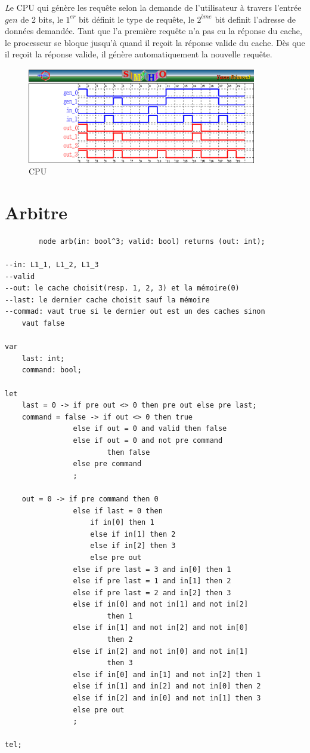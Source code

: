 \documentclass[a4paper,11pt]{report}
\begin{document}
	{\huge \itshape L}e CPU qui génère les requête selon la demande de l'utilisateur à travers l'entrée $gen$ de 2 bits, le $1^{er}$ bit définit le type de requête, le $2^{ème}$ bit definit l'adresse de données demandée. Tant que l'a première requête n'a pas eu la réponse du cache, le processeur se bloque jusqu'à quand il reçoit la réponse valide du cache. Dès que il reçoit la réponse valide, il génère automatiquement la nouvelle requête.
	
	\begin{figure}[!htbp]
		\centering
		\includegraphics[width = 10cm]{cpu_diag.png}
		\caption{CPU}
	\end{figure}
	
\chapter{Arbitre}
	\begin{framed}
		\begin{verbatim}
		node arb(in: bool^3; valid: bool) returns (out: int);

--in: L1_1, L1_2, L1_3
--valid
--out: le cache choisit(resp. 1, 2, 3) et la mémoire(0)
--last: le dernier cache choisit sauf la mémoire
--commad: vaut true si le dernier out est un des caches sinon 
	vaut false

var
    last: int;
    command: bool;

let
    last = 0 -> if pre out <> 0 then pre out else pre last;
    command = false -> if out <> 0 then true
                else if out = 0 and valid then false
                else if out = 0 and not pre command 
                		then false
                else pre command
                ;

    out = 0 -> if pre command then 0
                else if last = 0 then
                    if in[0] then 1
                    else if in[1] then 2
                    else if in[2] then 3
                    else pre out
                else if pre last = 3 and in[0] then 1
                else if pre last = 1 and in[1] then 2
                else if pre last = 2 and in[2] then 3
                else if in[0] and not in[1] and not in[2] 
                		then 1
                else if in[1] and not in[2] and not in[0] 
                		then 2
                else if in[2] and not in[0] and not in[1] 
                		then 3
                else if in[0] and in[1] and not in[2] then 1
                else if in[1] and in[2] and not in[0] then 2
                else if in[2] and in[0] and not in[1] then 3
                else pre out
                ;

tel;
		\end{verbatim}
	\end{framed}
	
\end{document}
